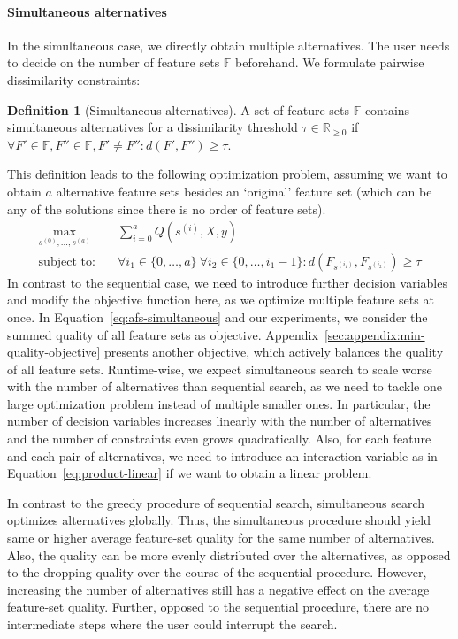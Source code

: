 \documentclass{article}
\theoremstyle{definition}
\newtheorem{definition}{Definition}
\begin{document}
\paragraph{Simultaneous alternatives}

In the simultaneous case, we directly obtain multiple alternatives.
The user needs to decide on the number of feature sets $\mathbb{F}$ beforehand.
We formulate pairwise dissimilarity constraints:
%
\begin{definition}[Simultaneous alternatives]
	A set of feature sets $\mathbb{F}$ contains simultaneous alternatives for a dissimilarity threshold $\tau \in \mathbb{R}_{\geq 0}$ if $\forall F' \in \mathbb{F}, F'' \in \mathbb{F}, F' \neq F'': d(F',F'') \geq \tau$.
	\label{def:simultaneous-alternative}
\end{definition}
%
This definition leads to the following optimization problem, assuming we want to obtain $a$ alternative feature sets besides an `original' feature set (which can be any of the solutions since there is no order of feature sets).
%
\begin{equation}
	\begin{aligned}
		\max_{s^{(0)}, \dots, s^{(a)}} &\quad \sum_{i=0}^a Q(s^{(i)},X,y) \\
		\text{subject to:} &\quad \forall i_1 \in \{0, \dots, a\}~\forall i_2 \in \{0, \dots, i_1-1\} : d(F_{s^{(i_1)}},F_{s^{(i_2)}}) \geq \tau
	\end{aligned}
	\label{eq:afs-simultaneous}
\end{equation}
%
In contrast to the sequential case, we need to introduce further decision variables and modify the objective function here, as we optimize multiple feature sets at once.
In Equation~\ref{eq:afs-simultaneous} and our experiments, we consider the summed quality of all feature sets as objective.
Appendix~\ref{sec:appendix:min-quality-objective} presents another objective, which actively balances the quality of all feature sets.
Runtime-wise, we expect simultaneous search to scale worse with the number of alternatives than sequential search, as we need to tackle one large optimization problem instead of multiple smaller ones.
In particular, the number of decision variables increases linearly with the number of alternatives and the number of constraints even grows quadratically.
Also, for each feature and each pair of alternatives, we need to introduce an interaction variable as in Equation~\ref{eq:product-linear} if we want to obtain a linear problem.

In contrast to the greedy procedure of sequential search, simultaneous search optimizes alternatives globally.
Thus, the simultaneous procedure should yield same or higher average feature-set quality for the same number of alternatives.
Also, the quality can be more evenly distributed over the alternatives, as opposed to the dropping quality over the course of the sequential procedure.
However, increasing the number of alternatives still has a negative effect on the average feature-set quality.
Further, opposed to the sequential procedure, there are no intermediate steps where the user could interrupt the search.
\end{document}
